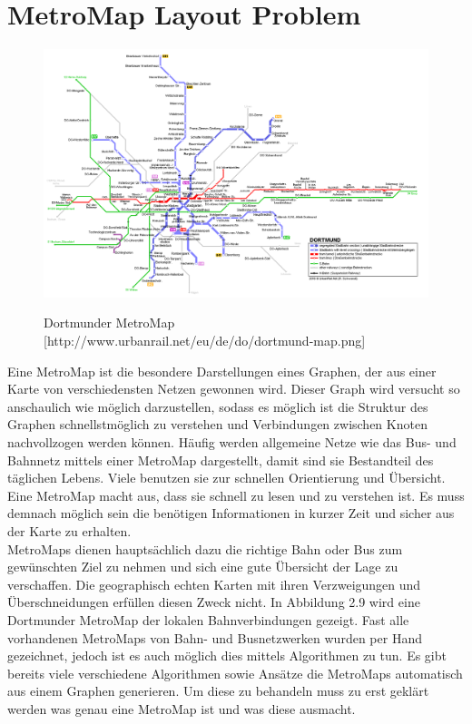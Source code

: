 \section{MetroMap Layout Problem}
\label{MetroMap}
%
\begin{figure}[t]
	\centering
	{\includegraphics[scale=0.3]{bilder/dortmundmap}\label{fig_dortmundmap}
	}\\
	\caption[Dortmunder MetroMap]{Dortmunder MetroMap [http://www.urbanrail.net/eu/de/do/dortmund-map.png]}
	\label{fig_dortmundmap}
\end{figure}

Eine MetroMap ist die besondere Darstellungen eines Graphen, der aus einer Karte von verschiedensten Netzen gewonnen wird. Dieser Graph wird versucht so anschaulich wie möglich darzustellen, sodass es möglich ist die Struktur des Graphen schnellstmöglich zu verstehen und Verbindungen zwischen Knoten nachvollzogen werden können. Häufig werden allgemeine Netze wie das Bus- und Bahnnetz mittels einer MetroMap dargestellt, damit sind sie Bestandteil des täglichen Lebens. Viele benutzen sie zur schnellen Orientierung und Übersicht. Eine MetroMap macht aus, dass sie schnell zu lesen und zu verstehen ist. Es muss demnach möglich sein die benötigen Informationen in kurzer Zeit und sicher aus der Karte zu erhalten. \\

MetroMaps dienen hauptsächlich dazu die richtige Bahn oder Bus zum gewünschten Ziel zu nehmen und sich eine gute Übersicht der Lage zu verschaffen. Die geographisch echten Karten mit ihren Verzweigungen und Überschneidungen erfüllen diesen Zweck nicht. In Abbildung 2.9 wird eine Dortmunder MetroMap der lokalen Bahnverbindungen gezeigt. Fast alle vorhandenen MetroMaps von Bahn- und Busnetzwerken wurden per Hand gezeichnet, jedoch ist es auch möglich dies mittels Algorithmen zu tun. Es gibt bereits viele verschiedene Algorithmen sowie Ansätze die MetroMaps automatisch aus einem Graphen generieren. Um diese zu behandeln muss zu erst geklärt werden was genau eine MetroMap ist und was diese ausmacht. \\

